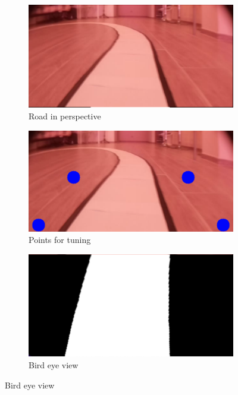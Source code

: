 \documentclass[12pt,a4paper]{article}
\begin{document}
\begin{large}
\begin{figure} [!hbp]
  \centering
    \begin{subfigure}[b]{0.3\textwidth}
    \centering
    \captionsetup{justification=centering}
      \includegraphics[width=\textwidth]{images/camera_perspective.png}
      \caption{Road in perspective}
      
    \end{subfigure}
    \hspace{0.1cm}
    \begin{subfigure}[b]{0.3\textwidth}
    \centering
    \captionsetup{justification=centering}
      \includegraphics[width=\textwidth]{images/points_warp.png}
      \caption{Points for tuning \\}
      
    \end{subfigure}
    \hspace{0.1cm}
    \begin{subfigure}[b]{0.3\textwidth}
    \centering
    \captionsetup{justification=centering}
      \includegraphics[width=\textwidth]{images/birds_eye_view.png}
      \caption{Bird eye view \\}
      

\end{subfigure}
\end{figure}
\end{large}
\end{document}
